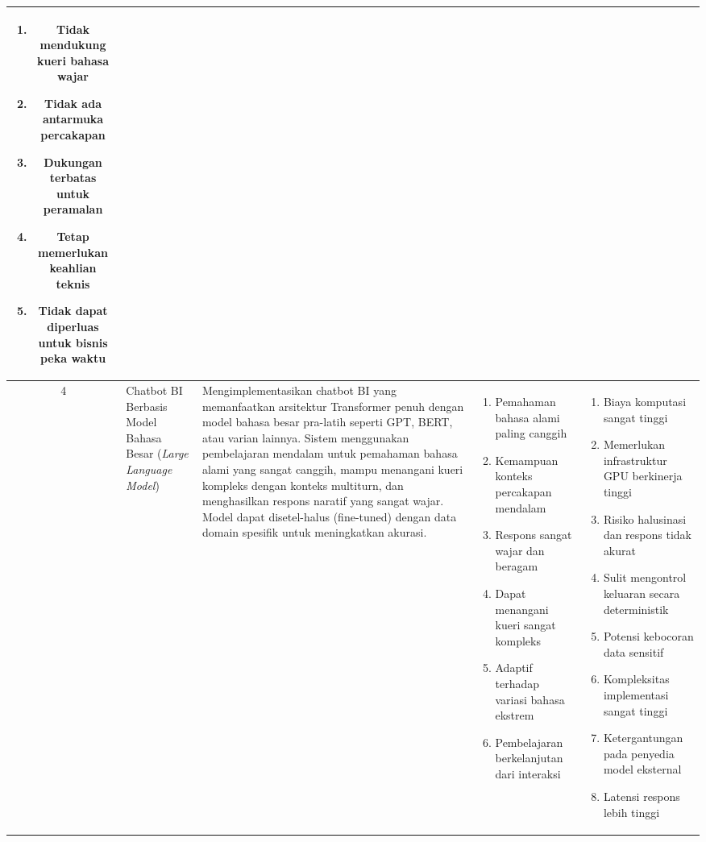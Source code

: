 \begin{longtable}{|c|p{2cm}|p{3.65cm}|p{2.7cm}|p{3cm}|}
\begin{enumerate}[leftmargin=*, nosep, noitemsep]
\item Tidak mendukung kueri bahasa wajar
\item Tidak ada antarmuka percakapan
\item Dukungan terbatas untuk peramalan
\item Tetap memerlukan keahlian teknis
\item Tidak dapat diperluas untuk bisnis peka waktu
\end{enumerate} \\
\hline

4 & 
Chatbot BI Berbasis Model Bahasa Besar (\textit{Large Language Model}) & 
Mengimplementasikan chatbot BI yang memanfaatkan arsitektur Transformer penuh dengan model bahasa besar pra-latih seperti GPT, BERT, atau varian lainnya. Sistem menggunakan pembelajaran mendalam untuk pemahaman bahasa alami yang sangat canggih, mampu menangani kueri kompleks dengan konteks multiturn, dan menghasilkan respons naratif yang sangat wajar. Model dapat disetel-halus (fine-tuned) dengan data domain spesifik untuk meningkatkan akurasi. & 

\begin{enumerate}[leftmargin=*, nosep, noitemsep]
\item Pemahaman bahasa alami paling canggih
\item Kemampuan konteks percakapan mendalam
\item Respons sangat wajar dan beragam
\item Dapat menangani kueri sangat kompleks
\item Adaptif terhadap variasi bahasa ekstrem
\item Pembelajaran berkelanjutan dari interaksi
\end{enumerate} & 

\begin{enumerate}[leftmargin=*, nosep, noitemsep]
\item Biaya komputasi sangat tinggi
\item Memerlukan infrastruktur GPU berkinerja tinggi
\item Risiko halusinasi dan respons tidak akurat
\item Sulit mengontrol keluaran secara deterministik
\item Potensi kebocoran data sensitif
\item Kompleksitas implementasi sangat tinggi
\item Ketergantungan pada penyedia model eksternal
\item Latensi respons lebih tinggi
\end{enumerate} \\
\hline

\end{longtable}

